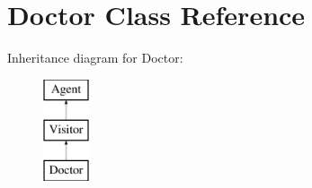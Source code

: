 \hypertarget{classDoctor}{\section{Doctor Class Reference}
\label{classDoctor}
}
Inheritance diagram for Doctor\-:\begin{figure}[H]
\begin{center}
\leavevmode
\includegraphics[height=3.000000cm]{classDoctor}
\end{center}
\end{figure}
